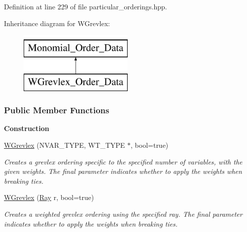 Definition at line 229 of file particular\+\_\+orderings.\+hpp.

Inheritance diagram for W\+Grevlex\+:\begin{figure}[H]
\begin{center}
\leavevmode
\includegraphics[height=3.000000cm]{group__orderinggroup}
\end{center}
\end{figure}
\subsubsection*{Public Member Functions}
\begin{Indent}\textbf{ Construction}\par
\begin{DoxyCompactItemize}
\item 
\mbox{\label{group__orderinggroup_a0ac3e66fb20c098427f6a08c92fd3771}} 
\hyperlink{group__orderinggroup_a0ac3e66fb20c098427f6a08c92fd3771}{W\+Grevlex} (N\+V\+A\+R\+\_\+\+T\+Y\+PE, W\+T\+\_\+\+T\+Y\+PE $\ast$, bool=true)
\begin{DoxyCompactList}\small\item\em Creates a grevlex ordering specific to the specified number of variables, with the given weights. The final parameter indicates whether to apply the weights when breaking ties. \end{DoxyCompactList}\item 
\mbox{\label{group__orderinggroup_a60f58ee49c04e416085a096c4e5798c1}} 
\hyperlink{group__orderinggroup_a60f58ee49c04e416085a096c4e5798c1}{W\+Grevlex} (\hyperlink{group___c_l_s_solvers_class_l_p___solvers_1_1_ray}{Ray} r, bool=true)
\begin{DoxyCompactList}\small\item\em Creates a weighted grevlex ordering using the specified ray. The final parameter indicates whether to apply the weights when breaking ties. \end{DoxyCompactList}\end{DoxyCompactItemize}
\end{Indent}
